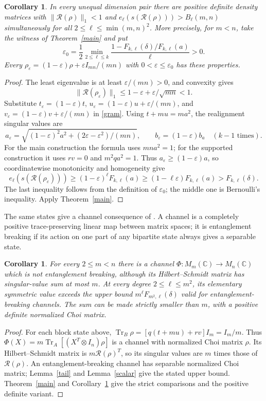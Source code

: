 \documentclass[11pt]{article}
\newtheorem{corollary}[theorem]{Corollary}
\newcommand{\R}{\mathcal R}
\newcommand{\e}{e}
\begin{document}
\begin{corollary}\label{interior}
In every unequal dimension pair there are positive definite density matrices
with $\|\R(\rho)\|_1<1$ and
$\e_\ell(s(\R(\rho)))>B_\ell(m,n)$ simultaneously for all
$2\le\ell\le\min(m,n)^2$.
More precisely, for $m<n$, take the witness of Theorem~\ref{main} and put
\[
 \varepsilon_0=\frac12\min_{2\le\ell\le k}
 \frac{1- F_{k,\ell}(\delta)/F_{k,\ell}(a)}{\ell}>0.
\]
Every $\rho_\varepsilon=(1-\varepsilon)\rho+
\varepsilon I_{mn}/(mn)$ with $0<\varepsilon\le\varepsilon_0$
has these properties.
\end{corollary}
\begin{proof}
The least eigenvalue is at least $\varepsilon/(mn)>0$, and convexity gives
\[
 \|\R(\rho_\varepsilon)\|_1
 \le1-\varepsilon+\varepsilon/\sqrt{mn}<1.
\]
Substitute $t_\varepsilon=(1-\varepsilon)t$,
$u_\varepsilon=(1-\varepsilon)u+\varepsilon/(mn)$, and
$v_\varepsilon=(1-\varepsilon)v+\varepsilon/(mn)$ in \eqref{gram}.
Using $t+mu=ma^2$, the realignment singular values are
\[
 a_\varepsilon=
 \sqrt{(1-\varepsilon)^2a^2+(2\varepsilon-\varepsilon^2)/(mn)},
 \qquad b_\varepsilon=(1-\varepsilon)b_a
 \quad(k-1\text{ times}).
\]
For the main construction the formula uses $mn a^2=1$; for the supported
construction it uses $r v=0$ and $m^2q a^2=1$.
Thus $a_\varepsilon\ge(1-\varepsilon)a$, so coordinatewise monotonicity
and homogeneity give
\[
 \e_\ell(s(\R(\rho_\varepsilon)))
 \ge(1-\varepsilon)^\ell F_{k,\ell}(a)
 \ge(1-\ell\varepsilon)F_{k,\ell}(a)>F_{k,\ell}(\delta).
\]
The last inequality follows from the definition of $\varepsilon_0$;
the middle one is Bernoulli's inequality. Apply Theorem~\ref{main}.
\end{proof}

The same states give a channel consequence of
\cite[Section~5, equations~(38)--(43)]{LAS}. A channel is a completely
positive trace-preserving linear map between matrix spaces; it is
entanglement breaking if its action on one part of any bipartite state
always gives a separable state.

\begin{corollary}\label{channels}
For every $2\le m<n$ there is a channel $\Phi:M_m(\mathbb C)\to
M_n(\mathbb C)$ which is not entanglement breaking, although its
Hilbert--Schmidt matrix has singular-value sum at most $m$.
At every degree $2\le\ell\le m^2$, its elementary symmetric value
exceeds the upper bound $m^\ell F_{m^2,\ell}(\delta)$ valid for
entanglement-breaking channels. The sum can be made strictly smaller
than $m$, with a positive definite normalized Choi matrix.
\end{corollary}
\begin{proof}
For each block state above,
$\operatorname{Tr}_B\rho=[q(t+mu)+rv]I_m=I_m/m$.
Thus $\Phi(X)=m\operatorname{Tr}_A[(X^T\otimes I_n)\rho]$
is a channel with normalized Choi matrix $\rho$.
Its Hilbert--Schmidt matrix is $m\R(\rho)^T$, so its singular values
are $m$ times those of $\R(\rho)$.
An entanglement-breaking channel has separable normalized Choi matrix;
Lemma~\ref{tail} and Lemma~\ref{scalar} give the stated upper bound.
Theorem~\ref{main} and Corollary~\ref{interior} give the strict
comparisons and the positive definite variant.
\end{proof}
\end{document}
